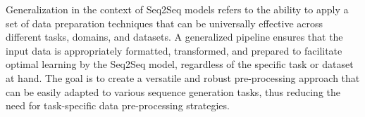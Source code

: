 \documentclass[conference]{IEEEtran}
\begin{document}
Generalization in the context of Seq2Seq models refers to the ability to apply a set of data preparation techniques that can be universally effective across different tasks, domains, and datasets. A generalized pipeline ensures that the input data is appropriately formatted, transformed, and prepared to facilitate optimal learning by the Seq2Seq model, regardless of the specific task or dataset at hand. The goal is to create a versatile and robust pre-processing approach that can be easily adapted to various sequence generation tasks, thus reducing the need for task-specific data pre-processing strategies.







\end{document}
